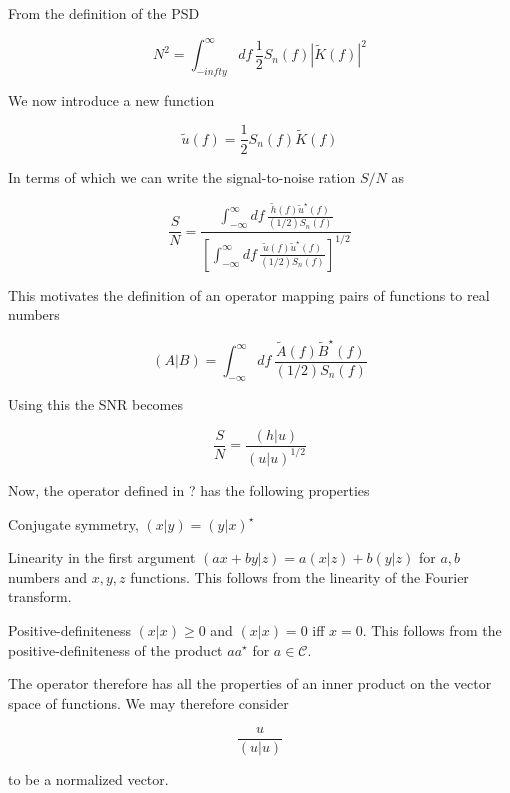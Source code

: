 
From the definition of the PSD

\begin{equation}
N^2 = \int_{-infty}^\infty df\,\frac{1}{2} S_n(f) |\tilde{K}(f)|^2
\end{equation}


We now introduce a new function

\begin{equation}
\tilde{u}(f) = \frac{1}{2} S_n(f) \tilde{K}(f)
\end{equation}

In terms of which we can write the signal-to-noise ration $S/N$ as


\begin{equation}
\frac{S}{N} =
\frac
  {\int_{-\infty}^\infty df\,
   \frac
     {\tilde{h}(f) \tilde{u}^\star(f)}
     {(1/2) S_n(f)}}
  {\left[\int_{-\infty}^\infty df\,
   \frac
     {\tilde{u}(f) \tilde{u}^\star(f)}
     {(1/2) S_n(f)}\right]^{1/2}}
\end{equation}

This motivates the definition of an operator mapping pairs of
functions to real numbers

\begin{equation}
(A|B) = \int_{-\infty}^\infty df\,
   \frac
     {\tilde{A}(f) \tilde{B}^\star(f)}
     {(1/2) S_n(f)}
\end{equation}

Using this the SNR becomes

\begin{equation}
\frac{S}{N} = \frac{(h|u)}{(u|u)^{1/2}}
\end{equation}

Now, the operator defined in ? has the following properties

Conjugate symmetry, $(x|y) = (y|x)^\star$

Linearity in the first argument $(ax + by|z) = a(x|z) + b(y|z)$ for
$a,b$ numbers and $x,y,z$ functions.  This follows from the linearity
of the Fourier transform.

Positive-definiteness $(x|x) \geq 0$ and $(x|x) = 0$ iff $x=0$.  This
follows from the positive-definiteness of the product $aa^\star$ for
$a \in \mathcal{C}$.

The operator therefore has all the properties of an inner product on
the vector space of functions.  We may therefore consider

\[
\frac{u}{(u|u)}
\]

to be a normalized vector.

